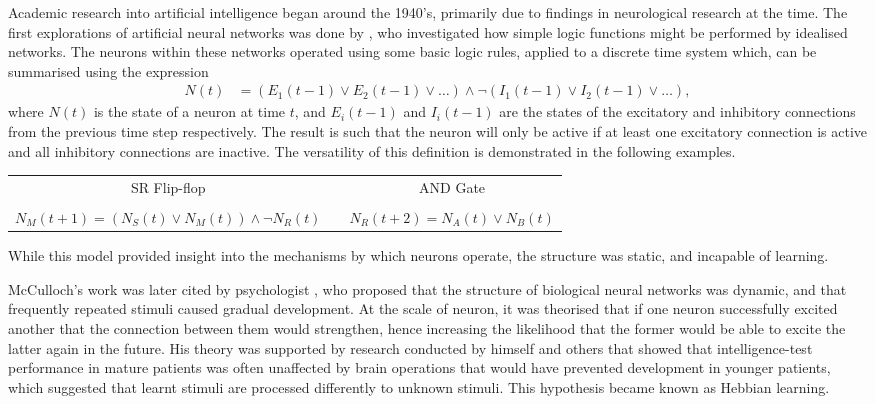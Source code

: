 Academic research into artificial intelligence began around the 1940's,
primarily due to findings in neurological research at the time.
The first explorations of artificial neural networks was done by
\cite{McCulloch:1943:Logical}, who investigated how simple logic functions
might be performed by idealised networks.
The neurons within these networks operated using some basic logic rules, applied
to a discrete time system which, can be summarised using the expression
\begin{align*}
    N(t) &= (E_1(t-1) \vee E_2(t-1) \vee \dots)
        \wedge \neg(I_1(t-1) \vee I_2(t-1) \vee \dots),
\end{align*}
where $N(t)$ is the state of a neuron at time $t$, and $E_i(t-1)$ and $I_i(t-1)$
are the states of the excitatory and inhibitory connections from the previous
time step respectively.
The result is such that the neuron will only be active if at least one
excitatory connection is active and all inhibitory connections are inactive.
The versatility of this definition is demonstrated in the following examples.
\begin{center}
    \begin{tabular}{ccc}
        SR Flip-flop & & AND Gate\\
         & & \\
        $\displaystyle N_M(t+1) = (N_S(t) \vee N_M(t)) \wedge\neg N_R(t)$ &
        &
        $\displaystyle N_R(t+2) = N_A(t) \vee N_B(t)$\\
    \end{tabular}
    \parbox{0.9\textwidth}{%
    }
\end{center}
While this model provided insight into the mechanisms by which neurons operate,
the structure was static, and incapable of learning.

McCulloch's work was later cited by psychologist \cite{Hebb:1949:Organization},
who proposed that the structure of biological neural networks was dynamic, and
that frequently repeated stimuli caused gradual development.
At the scale of neuron, it was theorised that if one neuron successfully
excited another that the connection between them would strengthen, hence
increasing the likelihood that the former would be able to excite the latter
again in the future.
His theory was supported by research conducted by himself and others that showed
that intelligence-test performance in mature patients was often unaffected by
brain operations that would have prevented development in younger patients,
which suggested that learnt stimuli are processed differently to unknown
stimuli.
This hypothesis became known as Hebbian learning.

